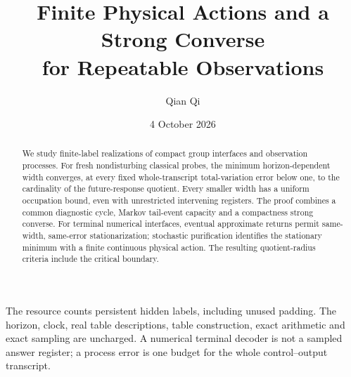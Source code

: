 \documentclass[11pt]{amsart}
\title[Finite actions and a process strong converse]{Finite Physical Actions and a Strong Converse\\for Repeatable Observations}
\author{Qian Qi}
\date{4 October 2026}
\numberwithin{equation}{section}
\theoremstyle{definition}\newtheorem{definition}[theorem]{Definition}
\theoremstyle{remark}\newtheorem{remark}[theorem]{Remark}
\begin{document}
\raggedbottom
\begin{abstract}
We study finite-label realizations of compact group interfaces and
observation processes. For fresh nondisturbing classical probes, the
minimum horizon-dependent width converges, at every fixed
whole-transcript total-variation error below one, to the cardinality
of the future-response quotient. Every smaller width has a uniform
occupation bound, even with unrestricted intervening registers.
The proof combines a common diagnostic cycle, Markov tail-event
capacity and a compactness strong converse. For terminal numerical
interfaces, eventual approximate returns permit same-width,
same-error stationarization; stochastic purification identifies the
stationary minimum with a finite continuous physical action.
The resulting quotient-radius criteria include the critical boundary.
\end{abstract}
\maketitle
\noindent The resource counts persistent hidden labels, including unused
padding. The horizon, clock, real table descriptions, table construction,
exact arithmetic and exact sampling are uncharged. A numerical terminal
decoder is not a sampled answer register; a process error is one budget
for the whole control--output transcript.
















\end{document}
